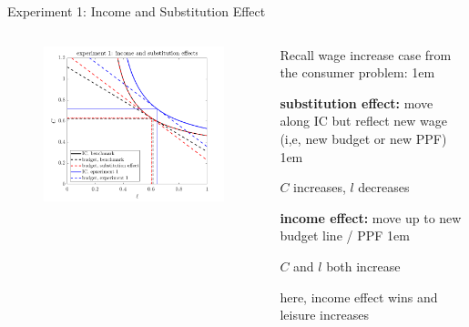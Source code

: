 \documentclass[11pt,aspectratio=43]{beamer}
\let\olditemize=\itemize
\let\endolditemize=\enditemize
\renewenvironment{itemize}{\olditemize \itemsep1em}{\endolditemize}
\theoremstyle{definition}
\begin{document}
\begin{frame}{Experiment 1: Income and Substitution Effect}
\label{slide:Experiment_1__Income_and_Substitution_Effect}
    \begin{columns}
        \begin{column}{0.5\textwidth}
            \begin{figure}
                \includegraphics[width=\textwidth]{./figures/IncomeSubEffect.png}
            \end{figure}
        \end{column}
        \begin{column}{0.5\textwidth}
            Recall wage increase case from the consumer problem:
            \begin{itemize}
                \item \textbf{substitution effect:} move along IC but reflect new wage (i,e, new budget or new PPF)
                \begin{itemize}
                    \item $ C $ increases, $ l $ decreases
                \end{itemize}
                \item \textbf{income effect:} move up to new budget line / PPF
                \begin{itemize}
                    \item $ C $ and $ l $ both increase
                \end{itemize}
                \item here, income effect wins and leisure increases
            \end{itemize}
        \end{column}
    \end{columns}
\end{frame}
\end{document}
